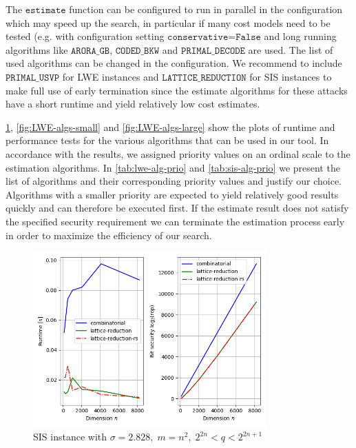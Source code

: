The $\texttt{estimate}$ function can be configured to run in parallel in the configuration which may speed up the search, in particular if many cost models need to be tested (e.g. with configuration setting $\texttt{conservative=False}$ and long running algorithms like $\texttt{ARORA\_GB}$, $\texttt{CODED\_BKW}$ and $\texttt{PRIMAL\_DECODE}$ are used. The list of used algorithms can be changed in the configuration. We recommend to include $\texttt{PRIMAL\_USVP}$ for LWE instances and $\texttt{LATTICE\_REDUCTION}$ for SIS instances to make full use of early termination since the estimate algorithms for these attacks have a short runtime and yield relatively low cost estimates.


\cref{fig:SIS-algs}, \ref{fig:LWE-algs-small} and \ref{fig:LWE-algs-large} show the plots of runtime and performance tests for the various algorithms that can be used in our tool. In accordance with the results, we assigned priority values on an ordinal scale to the estimation algorithms. In \cref{tab:lwe-alg-prio} and \ref{tab:sis-alg-prio} we present the list of algorithms and their corresponding priority values and justify our choice. Algorithms with a smaller priority are expected to yield relatively good results quickly and can therefore be executed first. If the estimate result does not satisfy the specified security requirement we can terminate the estimation process early in order to maximize the efficiency of our search.

\begin{figure}[]
    \centering
    \includegraphics[width=0.8\textwidth]{graphics/SIS_stddev=2,828_plots_1s.png}
    \caption{SIS instance with $\sigma=2.828,\; m=n^2, \; 2^{2n} < q < 2^{2n+1}$}\label{fig:SIS-algs}
\end{figure}

